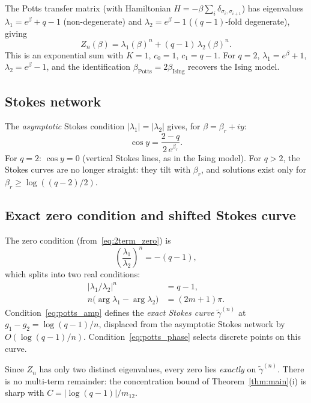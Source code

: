 \documentclass[12pt]{article}
\theoremstyle{definition}
\theoremstyle{remark}
\begin{document}
The Potts transfer matrix (with Hamiltonian $H = -\beta\sum_i
\delta_{\sigma_i, \sigma_{i+1}}$) has eigenvalues
$\lambda_1 = e^\beta + q - 1$ (non-degenerate) and
$\lambda_2 = e^\beta - 1$ ($(q{-}1)$-fold degenerate), giving
\begin{equation}\label{eq:Z_potts}
Z_n(\beta) = \lambda_1(\beta)^n + (q{-}1)\,\lambda_2(\beta)^n.
\end{equation}
This is an exponential sum with $K = 1$, $c_0 = 1$, $c_1 = q - 1$.
For $q = 2$, $\lambda_1 = e^\beta + 1$, $\lambda_2 = e^\beta - 1$,
and the identification $\beta_{\text{Potts}} = 2\beta_{\text{Ising}}$
recovers the Ising model.

\subsection{Stokes network}

The \emph{asymptotic} Stokes condition $|\lambda_1| = |\lambda_2|$
gives, for $\beta = \beta_r + iy$:
\begin{equation}\label{eq:potts_asym_stokes}
\cos y = \frac{2 - q}{2\,e^{\beta_r}}.
\end{equation}
For $q = 2$: $\cos y = 0$ (vertical Stokes lines, as in the Ising
model).  For $q > 2$, the Stokes curves are no longer straight:
they tilt with $\beta_r$, and solutions exist only for
$\beta_r \geq \log((q-2)/2)$.

\subsection{Exact zero condition and shifted Stokes curve}

The zero condition (from~\eqref{eq:2term_zero}) is
\begin{equation}\label{eq:potts_exact}
\left(\frac{\lambda_1}{\lambda_2}\right)^{\!n} = -(q - 1),
\end{equation}
which splits into two real conditions:
\begin{align}
|\lambda_1/\lambda_2|^n &= q - 1,
  \label{eq:potts_amp} \\
n\bigl(\arg\lambda_1 - \arg\lambda_2\bigr) &= (2m+1)\pi.
  \label{eq:potts_phase}
\end{align}
Condition~\eqref{eq:potts_amp} defines the \emph{exact Stokes curve}
$\tilde\gamma^{(n)}$ at $g_1 - g_2 = \log(q{-}1)/n$, displaced from
the asymptotic Stokes network by $O(\log(q{-}1)/n)$.
Condition~\eqref{eq:potts_phase} selects discrete points on this
curve.

Since $Z_n$ has only two distinct eigenvalues, every zero lies
\emph{exactly} on $\tilde\gamma^{(n)}$.  There is no multi-term
remainder: the concentration bound of Theorem~\ref{thm:main}(i) is
sharp with $C = |\log(q{-}1)|/m_{12}$.
\end{document}
